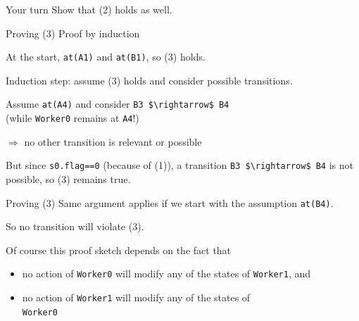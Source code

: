 \begin{frame}{Your turn}
  Show that (2) holds as well.
\end{frame}

\begin{frame}[fragile]{Proving (3)}
  Proof by induction


  At the start, \lstinline!at(A1)! and \lstinline!at(B1)!, so (3)
  holds.


  Induction step: assume (3) holds and consider possible transitions.


  Assume \lstinline!at(A4)! and consider
  \lstinline!B3 $\rightarrow$ B4! \\
  (while \lstinline!Worker0! remains at \lstinline!A4!!)

  $\Rightarrow$ no other transition is relevant or possible


  But since \lstinline!s0.flag==0! (because of (1)), a transition
  \lstinline!B3 $\rightarrow$ B4! is not possible, so (3) remains
  true.
\end{frame}

\begin{frame}{Proving (3)}
  Same argument applies if we start with the assumption
  \lstinline!at(B4)!.


  So no transition will violate (3).


  Of course this proof sketch depends on the fact that

  \begin{itemize}
  \item no action of \lstinline!Worker0! will modify any of the states
    of \lstinline!Worker1!, and
  \item no action of \lstinline!Worker1! will modify any of the states
    of \\
    \lstinline!Worker0!
  \end{itemize}
\end{frame}


